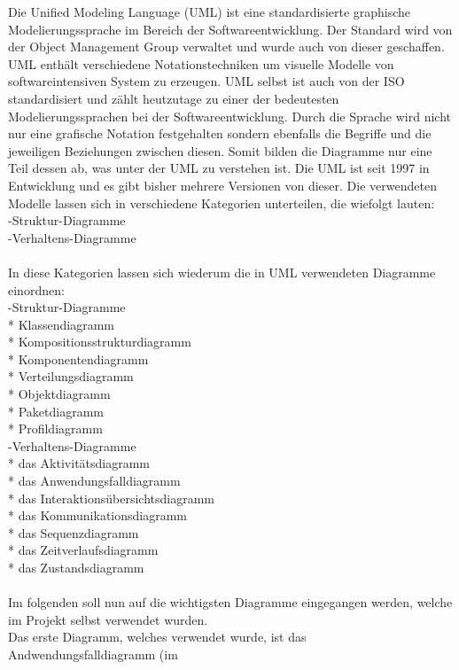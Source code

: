 Die Unified Modeling Language (UML) ist eine standardisierte graphische Modelierungssprache im Bereich der Softwareentwicklung. Der Standard wird von der Object Management Group verwaltet und wurde auch von dieser geschaffen. UML enthält verschiedene Notationstechniken um visuelle Modelle von softwareintensiven System zu erzeugen. UML selbst ist auch von der ISO standardisiert und zählt heutzutage zu einer der bedeutesten Modelierungssprachen bei der Softwareentwicklung. Durch die Sprache wird nicht nur eine grafische Notation festgehalten sondern ebenfalls die Begriffe und die jeweiligen Beziehungen zwischen diesen. Somit bilden die Diagramme nur eine Teil dessen ab, was unter der UML zu verstehen ist.
Die UML ist seit 1997 in Entwicklung und es gibt bisher mehrere Versionen von dieser.
Die verwendeten Modelle lassen sich in verschiedene Kategorien unterteilen, die wiefolgt lauten:\\
-Struktur-Diagramme\\
-Verhaltens-Diagramme\\
\\
In diese Kategorien lassen sich wiederum die in UML verwendeten Diagramme einordnen:\\
-Struktur-Diagramme\\
    * Klassendiagramm\\
    * Kompositionsstrukturdiagramm\\
    * Komponentendiagramm\\
    * Verteilungsdiagramm\\
    * Objektdiagramm\\
    * Paketdiagramm\\
    * Profildiagramm\\
-Verhaltens-Diagramme\\
    * das Aktivitätsdiagramm\\
    * das Anwendungsfalldiagramm\\
    * das Interaktionsübersichtsdiagramm\\
    * das Kommunikationsdiagramm\\
    * das Sequenzdiagramm\\
    * das Zeitverlaufsdiagramm\\
    * das Zustandsdiagramm\\
\\
Im folgenden soll nun auf die wichtigsten Diagramme eingegangen werden, welche im Projekt selbst verwendet wurden.\\
Das erste Diagramm, welches verwendet wurde, ist das Andwendungsfalldiagramm (im

